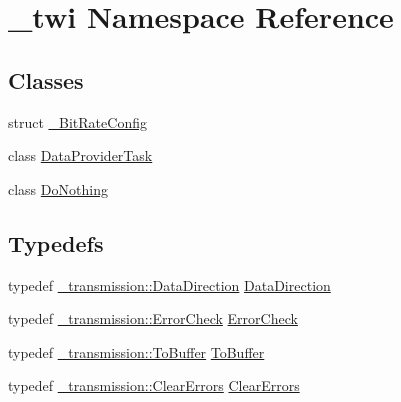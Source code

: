 \hypertarget{namespace__twi}{}\section{\+\_\+twi Namespace Reference}
\label{namespace__twi}
\subsection*{Classes}
\begin{DoxyCompactItemize}
\item 
struct \hyperlink{struct__twi_1_1__BitRateConfig}{\+\_\+\+Bit\+Rate\+Config}
\item 
class \hyperlink{class__twi_1_1DataProviderTask}{Data\+Provider\+Task}
\item 
class \hyperlink{class__twi_1_1DoNothing}{Do\+Nothing}
\end{DoxyCompactItemize}
\subsection*{Typedefs}
\begin{DoxyCompactItemize}
\item 
typedef \hyperlink{namespace__transmission_a49a33659d7c6abcf7f0180cd7e34fa0e}{\+\_\+transmission\+::\+Data\+Direction} \hyperlink{namespace__twi_a98f74649c4d80fc9488d6d800f594f1a}{Data\+Direction}
\item 
typedef \hyperlink{namespace__transmission_aea6508744dac6029815eb3aac4affda8}{\+\_\+transmission\+::\+Error\+Check} \hyperlink{namespace__twi_a0352adedf1acccfb9bc17c262397da0a}{Error\+Check}
\item 
typedef \hyperlink{namespace__transmission_a43fedd4787676a3bbd1a35dbfa138f06}{\+\_\+transmission\+::\+To\+Buffer} \hyperlink{namespace__twi_ad3ca29587a3e7dda67fc93c9be2a275d}{To\+Buffer}
\item 
typedef \hyperlink{class__transmission_1_1ClearErrors}{\+\_\+transmission\+::\+Clear\+Errors} \hyperlink{namespace__twi_aa8eb8d45cab75978982349de4e9780f9}{Clear\+Errors}
\end{DoxyCompactItemize}
